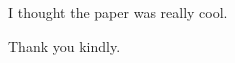 \reviewersection

\begin{point}
    \label{pt:101}
    I thought the paper was really cool.
\end{point}

\begin{reply}
    \label{rp:101}
    Thank you kindly.
\end{reply}
